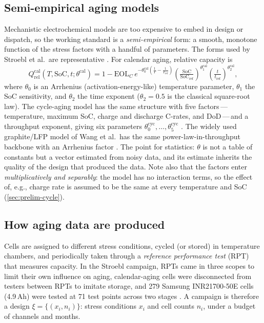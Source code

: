 \documentclass[11pt,letterpaper]{article}
\newcommand{\dash}{\,---\,}
\begin{document}
\subsection{Semi-empirical aging models}\label{sec:models}
Mechanistic electrochemical models are too expensive to embed in design or dispatch, so the working standard is a \emph{semi-empirical} form: a smooth, monotone function of the stress factors with a handful of parameters. The forms used by Stroebl et al.\ are representative \cite{stroebl2026}. For calendar aging, relative capacity is
\begin{equation}\label{eq:cal}
Q^{\mathrm{cal}}_{\mathrm{rel}}(T,\mathrm{SoC},t;\theta^{\mathrm{cal}}) = 1-\mathrm{EOL}_C\, e^{-\theta_0^{\mathrm{cal}}\left(\frac1T-\frac1{T_{\mathrm{ref}}}\right)}\left(\tfrac{\mathrm{SoC}}{\mathrm{SoC}_{\mathrm{ref}}}\right)^{\theta_1^{\mathrm{cal}}}\left(\tfrac{t}{t_{\mathrm{ref}}}\right)^{\theta_2^{\mathrm{cal}}},
\end{equation}
where $\theta_0$ is an Arrhenius (activation-energy-like) temperature parameter, $\theta_1$ the SoC sensitivity, and $\theta_2$ the time exponent ($\theta_2=0.5$ is the classical square-root law). The cycle-aging model has the same structure with five factors\dash temperature, maximum SoC, charge and discharge C-rates, and DoD\dash and a throughput exponent, giving six parameters $\theta^{\mathrm{cyc}}_0,\ldots,\theta^{\mathrm{cyc}}_5$ \cite{stroebl2026}. The widely used graphite/LFP model of Wang et al.\ has the same power-law-in-throughput backbone with an Arrhenius factor \cite{wang2011}. The point for statistics: $\theta$ is not a table of constants but a vector estimated from noisy data, and its estimate inherits the quality of the design that produced the data. Note also that the factors enter \emph{multiplicatively and separably}: the model has no interaction terms, so the effect of, e.g., charge rate is assumed to be the same at every temperature and SoC (\cref{sec:prelim-cycle}).

\subsection{How aging data are produced}
Cells are assigned to different stress conditions, cycled (or stored) in temperature chambers, and periodically taken through a \emph{reference performance test} (RPT) that measures capacity. In the Stroebl campaign, RPTs came in three scopes to limit their own influence on aging, calendar-aging cells were disconnected from testers between RPTs to imitate storage, and 279 Samsung INR21700-50E cells (4.9\,Ah) were tested at 71 test points across two stages \cite{stroebl2024}. A campaign is therefore a design $\xi=\{(x_i,n_i)\}$: stress conditions $x_i$ and cell counts $n_i$, under a budget of channels and months.
\end{document}
